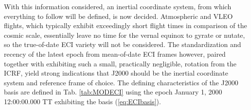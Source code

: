 \documentclass[11pt,dvipsnames]{thesis}
\begin{document}
With this information considered, an inertial coordinate system, from which everything to follow will be defined, is now decided. Atmospheric and VLEO flights, which typically exhibit exceedingly short flight times in comparison of the cosmic scale, essentially leave no time for the vernal equinox to gyrate or nutate, so the true-of-date ECI variety will not be considered. The standardization and recency of the latest epoch from mean-of-date ECI frames however, paired together with exhibiting such a small, practically negligible, rotation from the ICRF, yield strong indications that J2000 should be the inertial coordinate system and reference frame of choice. The defining characteristics of the J2000 basis are defined in Tab. \ref{tab:MODECI} using the epoch January 1, 2000 12:00:00.000 TT exhibiting the basis (\ref{eq:ECIbasis}).
\end{document}
